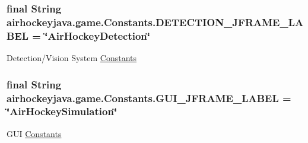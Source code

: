 \subsubsection[{D\+E\+T\+E\+C\+T\+I\+O\+N\+\_\+\+J\+F\+R\+A\+M\+E\+\_\+\+L\+A\+B\+E\+L}]{\setlength{\rightskip}{0pt plus 5cm}final String airhockeyjava.\+game.\+Constants.\+D\+E\+T\+E\+C\+T\+I\+O\+N\+\_\+\+J\+F\+R\+A\+M\+E\+\_\+\+L\+A\+B\+E\+L = \char`\"{}Air\+Hockey\+Detection\char`\"{}\hspace{0.3cm}{\ttfamily [static]}}\label{classairhockeyjava_1_1game_1_1_constants_a8a848f6d39f4b63e53885ba0f79d0673}
Detection/\+Vision System \hyperlink{classairhockeyjava_1_1game_1_1_constants}{Constants} \hypertarget{classairhockeyjava_1_1game_1_1_constants_a594232f8e17c988affdddcf85732f370}{}
\subsubsection[{G\+U\+I\+\_\+\+J\+F\+R\+A\+M\+E\+\_\+\+L\+A\+B\+E\+L}]{\setlength{\rightskip}{0pt plus 5cm}final String airhockeyjava.\+game.\+Constants.\+G\+U\+I\+\_\+\+J\+F\+R\+A\+M\+E\+\_\+\+L\+A\+B\+E\+L = \char`\"{}Air\+Hockey\+Simulation\char`\"{}\hspace{0.3cm}{\ttfamily [static]}}\label{classairhockeyjava_1_1game_1_1_constants_a594232f8e17c988affdddcf85732f370}
G\+U\+I \hyperlink{classairhockeyjava_1_1game_1_1_constants}{Constants} \hypertarget{classairhockeyjava_1_1game_1_1_constants_a6c91fee9271619be34cba9a8d83c4709}{}
